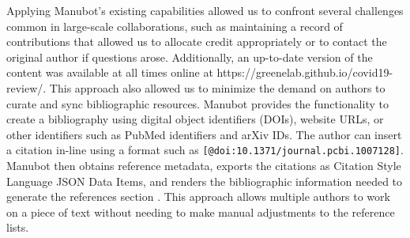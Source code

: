 \documentclass[sigconf]{acmart}
\begin{document}
Applying Manubot's existing capabilities allowed us to confront several challenges common in large-scale collaborations, such as maintaining a record of contributions that allowed us to allocate credit appropriately or to contact the original author if questions arose.
Additionally, an up-to-date version of the content was available at all times online at https://greenelab.github.io/covid19-review/.
This approach also allowed us to minimize the demand on authors to curate and sync bibliographic resources.
Manubot provides the functionality to create a bibliography using digital object identifiers (DOIs), website URLs, or other identifiers such as PubMed identifiers and arXiv IDs.
The author can insert a citation in-line using a format such as \texttt{{[}@doi:10.1371/journal.pcbi.1007128{]}}.
Manubot then obtains reference metadata, exports the citations as Citation Style Language JSON Data Items, and renders the bibliographic information needed to generate the references section \citep{YuJbg3zO}.
This approach allows multiple authors to work on a piece of text without needing to make manual adjustments to the reference lists.
\end{document}
